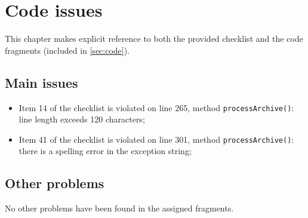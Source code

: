 \chapter{Code issues}
This chapter makes explicit reference to both the provided checklist and the code fragments (included in \autoref{sec:code}).

\section{Main issues}
\begin{itemize}
\item Item 14 of the checklist is violated on line 265, method \texttt{processArchive()}: line length exceeds 120 characters;
\item Item 41 of the checklist is violated on line 301, method \texttt{processArchive()}: there is a spelling error in the exception string;
\end{itemize}

\section{Other problems}
No other problems have been found in the assigned fragments.
